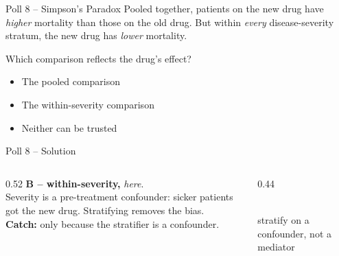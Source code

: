 \documentclass[aspectratio=169]{beamer}
\begin{document}
\begin{frame}{Poll 8 \;--\; Simpson's Paradox}
  \small
  Pooled together, patients on the new drug have \emph{higher} mortality than
  those on the old drug. But within \emph{every} disease-severity stratum, the
  new drug has \emph{lower} mortality.
  \vspace{0.8em}

  Which comparison reflects the drug's effect?
  \begin{itemize}
    \item[\textbf{A.}] The pooled comparison
    \item[\textbf{B.}] The within-severity comparison
    \item[\textbf{C.}] Neither can be trusted
  \end{itemize}
\end{frame}

\begin{frame}{Poll 8 \;--\; Solution}
  \small
  \begin{columns}[T]
    \begin{column}{0.52\textwidth}
      \textcolor{good}{\textbf{B -- within-severity,}} \emph{here}.\\[0.4em]
      Severity is a pre-treatment confounder: sicker patients got the new drug.
      Stratifying removes the bias.\\[0.3em]
      \textcolor{brick}{\textbf{Catch:}} only because the stratifier is a confounder.
    \end{column}
    \begin{column}{0.44\textwidth}
      \centering
      \\[0.3em]
      {\scriptsize stratify on a confounder, not a mediator}
    \end{column}
  \end{columns}
\end{frame}
\end{document}
